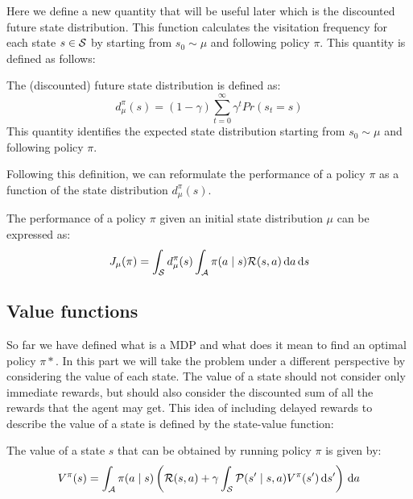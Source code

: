 Here we define a new quantity that will be useful later which is the discounted future state distribution. This function calculates the visitation frequency for each state $s\in\mathcal{S}$ by starting from $s_0\sim\mu$ and following policy $\pi$. This quantity is defined as follows:
\begin{definition}
The (discounted) future state distribution is defined as: 
\[
d_{\mu}^{\pi}(s) = (1-\gamma)\sum_{t=0}^{\infty} \gamma^t Pr(s_t = s)
\]
This quantity identifies the expected state distribution starting from $s_0 \sim \mu$ and following policy $\pi$. 
\end{definition}

Following this definition, we can reformulate the performance of a policy $\pi$ as a function of the state distribution $d_\mu^\pi(s)$.

\begin{definition}
The performance of a policy $\pi$ given an initial state distribution $\mu$ can be expressed as: 
\begin{equation*}
J_{\mu}(\pi) = \int_{\mathcal{S}} d_{\mu}^{\pi}(s) \int_{\mathcal{A}} \pi(a \mid s) \mathcal{R}(s,a) \, \textrm{d} a \, \textrm{d} s
\end{equation*}
\end{definition}


\subsection{Value functions}
So far we have defined what is a MDP and what does it mean to find an optimal policy $\pi*$. In this part we will take the problem under a different perspective by considering the value of each state. The value of a state should not consider only immediate rewards, but should also consider the discounted sum of all the rewards that the agent may get. This idea of including delayed rewards to describe the value of a state is defined by the state-value function:

\begin{definition}
The value of a state $s$ that can be obtained by running policy $\pi$ is given by:
\[
V^{\pi}(s) = \int_{\mathcal{A}} \pi(a \mid s) \left( \mathcal{R}(s,a) + \gamma \int_{\mathcal{S}} \mathcal{P}(s' \mid s, a) V^{\pi} (s') \, \textrm{d} s' \right) \, \textrm{d} a
\]
\end{definition}

